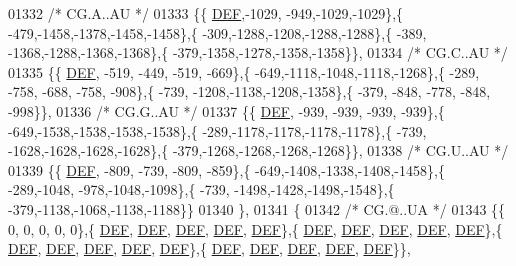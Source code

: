 \begin{DoxyCode}
01332 \textcolor{comment}{/* CG.A..AU */}
01333 \{\{  \mbox{\hyperlink{1_88_84__epars_8h_a397419fc12b37ed479c8abb9d444d843}{DEF}},-1029, -949,-1029,-1029\},\{ -479,-1458,-1378,-1458,-1458\},\{ -309,-1288,-1208,-1288,-1288\},\{ -389,
      -1368,-1288,-1368,-1368\},\{ -379,-1358,-1278,-1358,-1358\}\},
01334 \textcolor{comment}{/* CG.C..AU */}
01335 \{\{  \mbox{\hyperlink{1_88_84__epars_8h_a397419fc12b37ed479c8abb9d444d843}{DEF}}, -519, -449, -519, -669\},\{ -649,-1118,-1048,-1118,-1268\},\{ -289, -758, -688, -758, -908\},\{ -739,
      -1208,-1138,-1208,-1358\},\{ -379, -848, -778, -848, -998\}\},
01336 \textcolor{comment}{/* CG.G..AU */}
01337 \{\{  \mbox{\hyperlink{1_88_84__epars_8h_a397419fc12b37ed479c8abb9d444d843}{DEF}}, -939, -939, -939, -939\},\{ -649,-1538,-1538,-1538,-1538\},\{ -289,-1178,-1178,-1178,-1178\},\{ -739,
      -1628,-1628,-1628,-1628\},\{ -379,-1268,-1268,-1268,-1268\}\},
01338 \textcolor{comment}{/* CG.U..AU */}
01339 \{\{  \mbox{\hyperlink{1_88_84__epars_8h_a397419fc12b37ed479c8abb9d444d843}{DEF}}, -809, -739, -809, -859\},\{ -649,-1408,-1338,-1408,-1458\},\{ -289,-1048, -978,-1048,-1098\},\{ -739,
      -1498,-1428,-1498,-1548\},\{ -379,-1138,-1068,-1138,-1188\}\}
01340 \},
01341 \{
01342 \textcolor{comment}{/* CG.@..UA */}
01343 \{\{    0,    0,    0,    0,    0\},\{  \mbox{\hyperlink{1_88_84__epars_8h_a397419fc12b37ed479c8abb9d444d843}{DEF}},  \mbox{\hyperlink{1_88_84__epars_8h_a397419fc12b37ed479c8abb9d444d843}{DEF}},  \mbox{\hyperlink{1_88_84__epars_8h_a397419fc12b37ed479c8abb9d444d843}{DEF}},  \mbox{\hyperlink{1_88_84__epars_8h_a397419fc12b37ed479c8abb9d444d843}{DEF}},  \mbox{\hyperlink{1_88_84__epars_8h_a397419fc12b37ed479c8abb9d444d843}{DEF}}\},\{  
      \mbox{\hyperlink{1_88_84__epars_8h_a397419fc12b37ed479c8abb9d444d843}{DEF}},  \mbox{\hyperlink{1_88_84__epars_8h_a397419fc12b37ed479c8abb9d444d843}{DEF}},  \mbox{\hyperlink{1_88_84__epars_8h_a397419fc12b37ed479c8abb9d444d843}{DEF}},  \mbox{\hyperlink{1_88_84__epars_8h_a397419fc12b37ed479c8abb9d444d843}{DEF}},  \mbox{\hyperlink{1_88_84__epars_8h_a397419fc12b37ed479c8abb9d444d843}{DEF}}\},\{  \mbox{\hyperlink{1_88_84__epars_8h_a397419fc12b37ed479c8abb9d444d843}{DEF}},  \mbox{\hyperlink{1_88_84__epars_8h_a397419fc12b37ed479c8abb9d444d843}{DEF}},  \mbox{\hyperlink{1_88_84__epars_8h_a397419fc12b37ed479c8abb9d444d843}{DEF}},  \mbox{\hyperlink{1_88_84__epars_8h_a397419fc12b37ed479c8abb9d444d843}{DEF}},  
      \mbox{\hyperlink{1_88_84__epars_8h_a397419fc12b37ed479c8abb9d444d843}{DEF}}\},\{  \mbox{\hyperlink{1_88_84__epars_8h_a397419fc12b37ed479c8abb9d444d843}{DEF}},  \mbox{\hyperlink{1_88_84__epars_8h_a397419fc12b37ed479c8abb9d444d843}{DEF}},  \mbox{\hyperlink{1_88_84__epars_8h_a397419fc12b37ed479c8abb9d444d843}{DEF}},  \mbox{\hyperlink{1_88_84__epars_8h_a397419fc12b37ed479c8abb9d444d843}{DEF}},  \mbox{\hyperlink{1_88_84__epars_8h_a397419fc12b37ed479c8abb9d444d843}{DEF}}\}\},

\end{DoxyCode}
